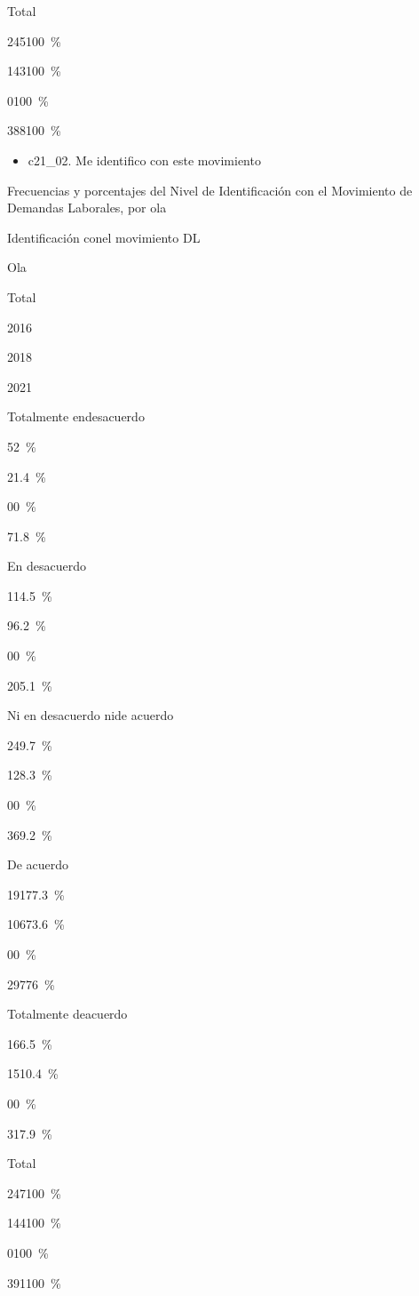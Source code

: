 \documentclass[
  12pt,
]{book}
\providecommand{\tightlist}{%
  \setlength{\itemsep}{0pt}\setlength{\parskip}{0pt}}
\begin{document}
Total

{245}{100~\%}

{143}{100~\%}

{0}{100~\%}

{388}{100~\%}

\begin{itemize}
\tightlist
\item
  c21\_02. Me identifico con este movimiento
\end{itemize}

Frecuencias y porcentajes del Nivel de Identificación con el Movimiento de Demandas Laborales, por ola

Identificación conel movimiento DL

Ola

Total

2016

2018

2021

Totalmente endesacuerdo

{5}{2~\%}

{2}{1.4~\%}

{0}{0~\%}

{7}{1.8~\%}

En desacuerdo

{11}{4.5~\%}

{9}{6.2~\%}

{0}{0~\%}

{20}{5.1~\%}

Ni en desacuerdo nide acuerdo

{24}{9.7~\%}

{12}{8.3~\%}

{0}{0~\%}

{36}{9.2~\%}

De acuerdo

{191}{77.3~\%}

{106}{73.6~\%}

{0}{0~\%}

{297}{76~\%}

Totalmente deacuerdo

{16}{6.5~\%}

{15}{10.4~\%}

{0}{0~\%}

{31}{7.9~\%}

Total

{247}{100~\%}

{144}{100~\%}

{0}{100~\%}

{391}{100~\%}
\end{document}
